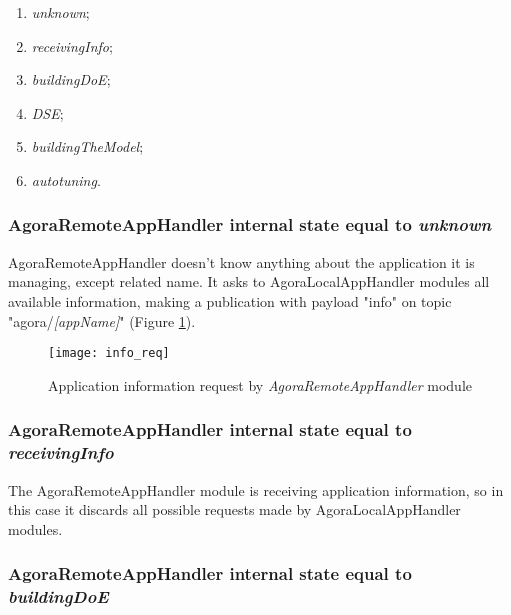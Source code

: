 \begin{enumerate}

    \item \textit{unknown};

    \item \textit{receivingInfo};

    \item \textit{buildingDoE};

    \item \textit{DSE};

    \item \textit{buildingTheModel};

    \item \textit{autotuning}.

\end{enumerate}


\subsubsection{AgoraRemoteAppHandler internal state equal to \textit{unknown}}\label{req_info}

AgoraRemoteAppHandler doesn't know anything about the application it is managing, except related name. It asks to AgoraLocalAppHandler modules all available information, making a publication with payload "info" on topic "agora/\textit{[appName]}" (Figure \ref{fig::remotInfoReq}).

\begin{figure}[ht]

    \centering
    \texttt{[image: info\_req]}
    \caption{Application information request by \textit{AgoraRemoteAppHandler} module}

    \label{fig::remotInfoReq}
    
\end{figure}


\subsubsection{AgoraRemoteAppHandler internal state equal to \textit{receivingInfo}}

The AgoraRemoteAppHandler module is receiving application information, so in this case it discards all possible requests made by AgoraLocalAppHandler modules.


\subsubsection{AgoraRemoteAppHandler internal state equal to \textit{buildingDoE}}


